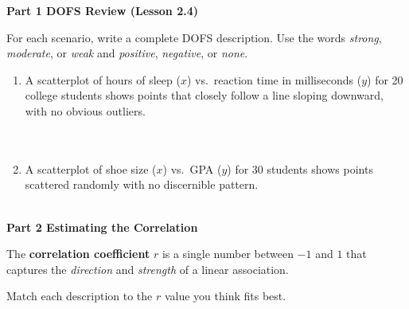 \documentclass[10pt]{article}
\begin{document}
\namedateperiod

\vspace{0.2in}

{\large\bfseries\color{navy} Part 1 \quad DOFS Review (Lesson 2.4)}

\vspace{0.1in}

\noindent For each scenario, write a complete DOFS description. Use the words
\textit{strong}, \textit{moderate}, or \textit{weak} and \textit{positive},
\textit{negative}, or \textit{none}.

\vspace{0.08in}

\begin{enumerate}[leftmargin=1.6em, itemsep=0.18in]

  \item A scatterplot of hours of sleep ($x$) vs.\ reaction time in milliseconds ($y$)
        for 20 college students shows points that closely follow a line sloping downward,
        with no obvious outliers.\\[8pt]
        \writeline\\[2pt]\writeline\\[2pt]\writeline

  \item A scatterplot of shoe size ($x$) vs.\ GPA ($y$) for 30 students shows points
        scattered randomly with no discernible pattern.\\[8pt]
        \writeline\\[2pt]\writeline

\end{enumerate}

\vspace{0.22in}

{\large\bfseries\color{navy} Part 2 \quad Estimating the Correlation}

\vspace{0.1in}

\noindent The \textbf{correlation coefficient} $r$ is a single number between $-1$ and $1$
that captures the \emph{direction} and \emph{strength} of a linear association.

\vspace{0.1in}

\noindent Match each description to the $r$ value you think fits best.
\end{document}
